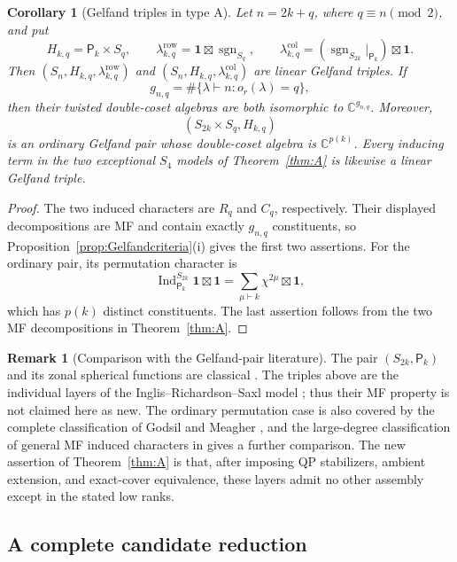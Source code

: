 \documentclass[11pt]{article}
\numberwithin{equation}{section}
\newtheorem{corollary}[theorem]{Corollary}
\theoremstyle{definition}
\newtheorem{remark}[theorem]{Remark}
\DeclareMathOperator{\Ind}{Ind}
\DeclareMathOperator{\sgn}{sgn}
\newcommand{\C}{\mathbb C}
\newcommand{\row}{\mathrm{row}}
\newcommand{\col}{\mathrm{col}}
\newcommand{\one}{\mathbf 1}
\newcommand{\pair}{\mathsf P}
\begin{document}
\begin{corollary}[Gelfand triples in type A]
\label{cor:AGelfand}
Let \(n=2k+q\), where \(q\equiv n\pmod2\), and put
\[
 H_{k,q}=\pair_k\times S_q,\qquad
 \lambda_{k,q}^{\row}=\one\boxtimes\sgn_{S_q},\qquad
 \lambda_{k,q}^{\col}=
   (\sgn_{S_{2k}}|_{\pair_k})\boxtimes\one .
\]
Then \((S_n,H_{k,q},\lambda_{k,q}^{\row})\) and
\((S_n,H_{k,q},\lambda_{k,q}^{\col})\) are linear Gelfand triples.
If
\[
 g_{n,q}=\#\{\lambda\vdash n:o_r(\lambda)=q\},
\]
then their twisted double-coset algebras are both isomorphic to
\(\C^{g_{n,q}}\).
Moreover,
\[
 (S_{2k}\times S_q,H_{k,q})
\]
is an ordinary Gelfand pair whose double-coset algebra is
\(\C^{p(k)}\).
Every inducing term in the two exceptional \(S_4\) models of
Theorem~\ref{thm:A} is likewise a linear Gelfand triple.
\end{corollary}
\begin{proof}
The two induced characters are \(R_q\) and \(C_q\), respectively.
Their displayed decompositions are MF and contain exactly \(g_{n,q}\)
constituents, so Proposition~\ref{prop:Gelfandcriteria}(i) gives the
first two assertions.
For the ordinary pair, its permutation character is
\[
 \Ind_{\pair_k}^{S_{2k}}\one\boxtimes\one
 =\sum_{\mu\vdash k}\chi^{2\mu}\boxtimes\one,
\]
which has \(p(k)\) distinct constituents.
The last assertion follows from the two MF decompositions in
Theorem~\ref{thm:A}.
\end{proof}

\begin{remark}[Comparison with the Gelfand-pair literature]
The pair \((S_{2k},\pair_k)\) and its zonal spherical functions are
classical \cite[Chapter VII]{MacdonaldBook}.
The triples above are the individual layers of the
Inglis--Richardson--Saxl model \cite{IRS}; thus their MF property is not
claimed here as new.
The ordinary permutation case is also covered by the complete
classification of Godsil and Meagher \cite{GodsilMeagher}, and the
large-degree classification of general MF induced characters in
\cite{Turek} gives a further comparison.
The new assertion of Theorem~\ref{thm:A} is that, after imposing QP
stabilizers, ambient extension, and exact-cover equivalence, these
layers admit no other assembly except in the stated low ranks.
\end{remark}

\subsection{A complete candidate reduction}
\end{document}
